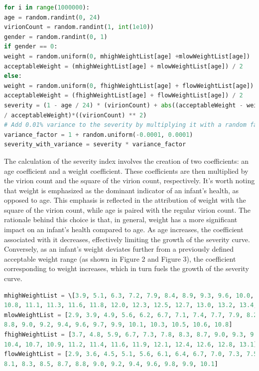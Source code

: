 \documentclass{article}
\begin{document}
\begin{lstlisting}[language=Python, caption={Severity index calculation}, label={lst:python}]
for i in range(1000000):
age = random.randint(0, 24)
virionCount = random.randint(1, int(1e10))
gender = random.randint(0, 1)
if gender == 0:
weight = random.uniform(0, mhighWeightList[age] +mlowWeightList[age])
acceptableWeight = (mhighWeightList[age] + mlowWeightList[age]) / 2
else:
weight = random.uniform(0, fhighWeightList[age] + flowWeightList[age])
acceptableWeight = (fhighWeightList[age] + flowWeightList[age]) / 2
severity = (1 - age / 24) * (virionCount) + abs((acceptableWeight - weight)
/ acceptableWeight)*((virionCount) ** 2)
# Add 0.01% variance to the severity by multiplying it with a random factor
variance_factor = 1 + random.uniform(-0.0001, 0.0001)
severity_with_variance = severity * variance_factor
\end{lstlisting}

The calculation of the severity index involves the creation of two coefficients: an
age coefficient and a weight coefficient. These coefficients are then multiplied by the
virion count and the square of the virion count, respectively. It's worth noting that weight
is emphasized as the dominant indicator of an infant's health, as opposed to age. This
emphasis is reflected in the attribution of weight with the square of the virion count,
while age is paired with the regular virion count. The rationale behind this choice is that,
in general, weight has a more significant impact on an infant's health compared to age. As
age increases, the coefficient associated with it decreases, effectively limiting the growth
of the severity curve. Conversely, as an infant's weight deviates further from a previously
defined acceptable weight range (as shown in Figure 2 and Figure 3), the coefficient
corresponding to weight increases, which in turn fuels the growth of the severity curve.
\begin{lstlisting}[language=Python, caption={Weight lists}, label={lst:python}]
mhighWeightList = \[3.9, 5.1, 6.3, 7.2, 7.9, 8.4, 8.9, 9.3, 9.6, 10.0, 10.3, 10.5,
10.8, 11.1, 11.3, 11.6, 11.8, 12.0, 12.3, 12.5, 12.7, 13.0, 13.2, 13.4, 13.7]
mlowWeightList = [2.9, 3.9, 4.9, 5.6, 6.2, 6.7, 7.1, 7.4, 7.7, 7.9, 8.2, 8.4, 8.6, 
8.8, 9.0, 9.2, 9.4, 9.6, 9.7, 9.9, 10.1, 10.3, 10.5, 10.6, 10.8]
fhighWeightList = [3.7, 4.8, 5.9, 6.7, 7.3, 7.8, 8.3, 8.7, 9.0, 9.3, 9.6, 9.9, 10.2,
10.4, 10.7, 10.9, 11.2, 11.4, 11.6, 11.9, 12.1, 12.4, 12.6, 12.8, 13.1]
flowWeightList = [2.9, 3.6, 4.5, 5.1, 5.6, 6.1, 6.4, 6.7, 7.0, 7.3, 7.5, 7.7, 7.9,
8.1, 8.3, 8.5, 8.7, 8.8, 9.0, 9.2, 9.4, 9.6, 9.8, 9.9, 10.1]
\end{lstlisting}
\end{document}
